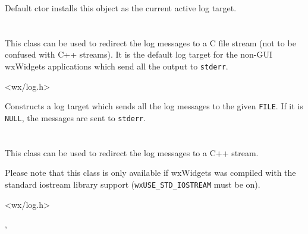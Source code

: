 Default ctor installs this object as the current active log target.


\section{}\label{wxlogstderr}

This class can be used to redirect the log messages to a C file stream (not to
be confused with C++ streams). It is the default log target for the non-GUI
wxWidgets applications which send all the output to {\tt stderr}.




<wx/log.h>






Constructs a log target which sends all the log messages to the given
{\tt FILE}. If it is {\tt NULL}, the messages are sent to {\tt stderr}.


\section{}\label{wxlogstream}

This class can be used to redirect the log messages to a C++ stream.

Please note that this class is only available if wxWidgets was compiled with
the standard iostream library support ({\tt wxUSE\_STD\_IOSTREAM} must be on).




<wx/log.h>


,\\

